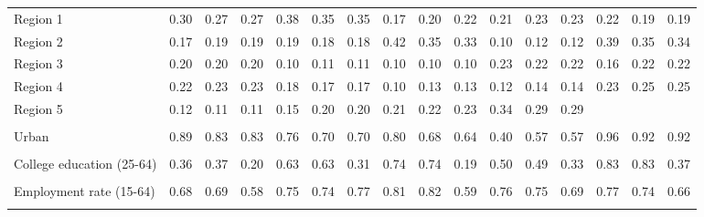 \begin{tabular}{l*{15}{c}}
\\
Region 1 & 0.30 & 0.27 & 0.27 & 0.38 & 0.35 & 0.35 & 0.17 & 0.20 & 0.22 & 0.21 & 0.23 & 0.23 & 0.22 & 0.19 & 0.19 \\
Region 2 & 0.17 & 0.19 & 0.19 & 0.19 & 0.18 & 0.18 & 0.42 & 0.35 & 0.33 & 0.10 & 0.12 & 0.12 & 0.39 & 0.35 & 0.34 \\
Region 3 & 0.20 & 0.20 & 0.20 & 0.10 & 0.11 & 0.11 & 0.10 & 0.10 & 0.10 & 0.23 & 0.22 & 0.22 & 0.16 & 0.22 & 0.22 \\
Region 4 & 0.22 & 0.23 & 0.23 & 0.18 & 0.17 & 0.17 & 0.10 & 0.13 & 0.13 & 0.12 & 0.14 & 0.14 & 0.23 & 0.25 & 0.25 \\
Region 5 & 0.12 & 0.11 & 0.11 & 0.15 & 0.20 & 0.20 & 0.21 & 0.22 & 0.23 & 0.34 & 0.29 & 0.29 & & & \\
\\
Urban & 0.89 & 0.83 & 0.83 & 0.76 & 0.70 & 0.70 & 0.80 & 0.68 & 0.64 & 0.40 & 0.57 & 0.57 & 0.96 & 0.92 & 0.92 \\
\\
College education (25-64) & 0.36 & 0.37 & 0.20 & 0.63 & 0.63 & 0.31 & 0.74 & 0.74 & 0.19 & 0.50 & 0.49 & 0.33 & 0.83 & 0.83 & 0.37 \\
\\
Employment rate (15-64) & 0.68 & 0.69 & 0.58 & 0.75 & 0.74 & 0.77 & 0.81 & 0.82 & 0.59 & 0.76 & 0.75 & 0.69 & 0.77 & 0.74 & 0.66 \\
\\
\bottomrule
\end{tabular}